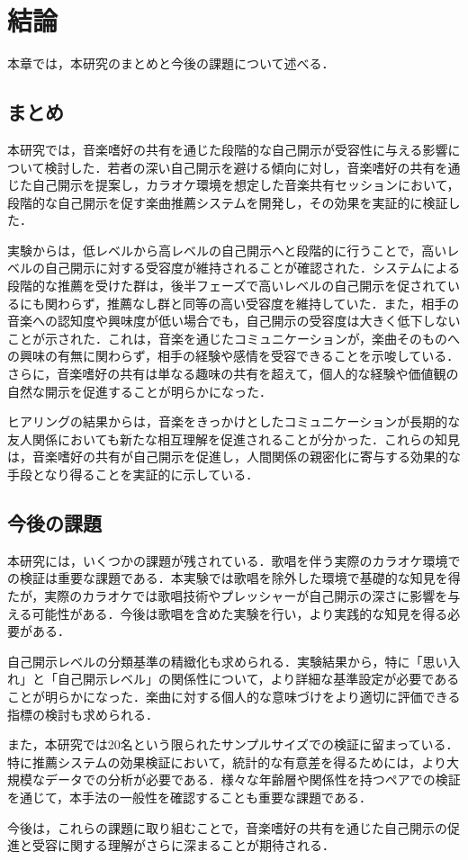 \chapter{結論}

本章では，本研究のまとめと今後の課題について述べる．

\section{まとめ}

本研究では，音楽嗜好の共有を通じた段階的な自己開示が受容性に与える影響について検討した．若者の深い自己開示を避ける傾向に対し，音楽嗜好の共有を通じた自己開示を提案し，カラオケ環境を想定した音楽共有セッションにおいて，段階的な自己開示を促す楽曲推薦システムを開発し，その効果を実証的に検証した．

実験からは，低レベルから高レベルの自己開示へと段階的に行うことで，高いレベルの自己開示に対する受容度が維持されることが確認された．システムによる段階的な推薦を受けた群は，後半フェーズで高いレベルの自己開示を促されているにも関わらず，推薦なし群と同等の高い受容度を維持していた．また，相手の音楽への認知度や興味度が低い場合でも，自己開示の受容度は大きく低下しないことが示された．これは，音楽を通じたコミュニケーションが，楽曲そのものへの興味の有無に関わらず，相手の経験や感情を受容できることを示唆している．さらに，音楽嗜好の共有は単なる趣味の共有を超えて，個人的な経験や価値観の自然な開示を促進することが明らかになった．

ヒアリングの結果からは，音楽をきっかけとしたコミュニケーションが長期的な友人関係においても新たな相互理解を促進されることが分かった．これらの知見は，音楽嗜好の共有が自己開示を促進し，人間関係の親密化に寄与する効果的な手段となり得ることを実証的に示している．


\section{今後の課題}

本研究には，いくつかの課題が残されている．歌唱を伴う実際のカラオケ環境での検証は重要な課題である．本実験では歌唱を除外した環境で基礎的な知見を得たが，実際のカラオケでは歌唱技術やプレッシャーが自己開示の深さに影響を与える可能性がある．今後は歌唱を含めた実験を行い，より実践的な知見を得る必要がある．

自己開示レベルの分類基準の精緻化も求められる．実験結果から，特に「思い入れ」と「自己開示レベル」の関係性について，より詳細な基準設定が必要であることが明らかになった．楽曲に対する個人的な意味づけをより適切に評価できる指標の検討も求められる．

また，本研究では20名という限られたサンプルサイズでの検証に留まっている．特に推薦システムの効果検証において，統計的な有意差を得るためには，より大規模なデータでの分析が必要である．様々な年齢層や関係性を持つペアでの検証を通じて，本手法の一般性を確認することも重要な課題である．

今後は，これらの課題に取り組むことで，音楽嗜好の共有を通じた自己開示の促進と受容に関する理解がさらに深まることが期待される．
